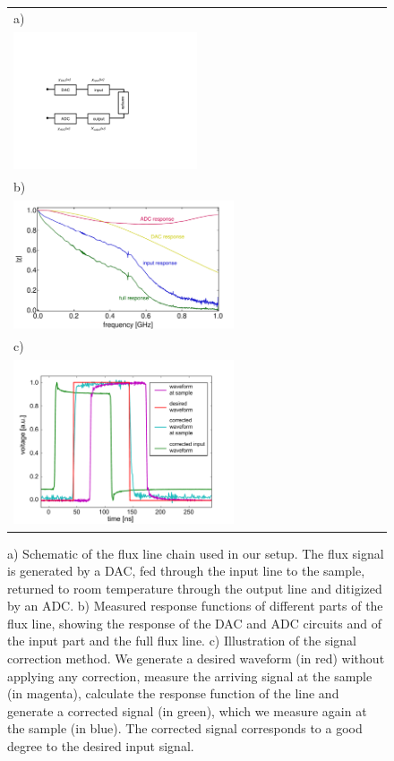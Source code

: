 \begin{figure}
	\begin{tabular}{l}
	 a) \\ \includegraphics[width=0.5\textwidth]{"./material/figures/measurement/fluxline_model"} \\
	 b) \\ \includegraphics[width=0.6\textwidth]{"./material_thesis/fluxline response/response"} \\
	 c) \\ \includegraphics[width=0.6\textwidth]{"./data/ct5/2010_06_15 - fluxline response/test_measurement_modified"}
	 \end{tabular}
	 \caption[]{a) Schematic of the flux line chain used in our setup. The flux signal is generated by a DAC, fed through the input line to the sample, returned to room temperature through the output line and ditigized by an ADC. b) Measured response functions of different parts of the flux line, showing the response of the DAC and ADC circuits and of the input part and the full flux line. c) Illustration of the signal correction method. We generate a desired waveform (in red) without applying any correction, measure the arriving signal at the sample (in magenta), calculate the response function of the line and generate a corrected signal (in green), which we measure again at the sample (in blue). The corrected signal corresponds to a good degree to the desired input signal.}
	 \label{fig:FluxLineResponseFunction}
\end{figure}

